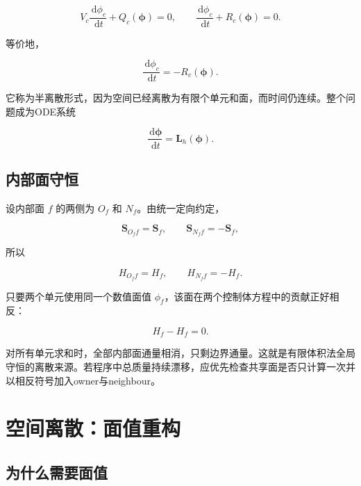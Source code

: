 \documentclass[UTF8,12pt,a4paper,fontset=fandol]{ctexart}
\numberwithin{equation}{section}
\newcommand{\dd}{\,\mathrm d}
\newcommand{\Sf}{\bm S}
\begin{document}
\begin{equation}
  \boxed{
  V_c\frac{\dd\phi_c}{\dd t}+Q_c(\bm\phi)=0,
  \qquad
  \frac{\dd\phi_c}{\dd t}+R_c(\bm\phi)=0
  }.
  \label{eq:semidiscrete}
\end{equation}

等价地，

\begin{equation}
  \boxed{
  \frac{\dd\phi_c}{\dd t}=-R_c(\bm\phi)
  }.
\end{equation}

它称为半离散形式，因为空间已经离散为有限个单元和面，而时间仍连续。整个问题成为ODE系统

\begin{equation}
  \frac{\dd\bm\phi}{\dd t}
  =
  \bm L_h(\bm\phi).
\end{equation}

\subsection{内部面守恒}

设内部面 $f$ 的两侧为 $O_f$ 和 $N_f$。由统一定向约定，

\begin{equation}
  \Sf_{O_f f}=\Sf_f,
  \qquad
  \Sf_{N_f f}=-\Sf_f,
\end{equation}

所以

\begin{equation}
  H_{O_f f}=H_f,
  \qquad
  H_{N_f f}=-H_f.
\end{equation}

只要两个单元使用同一个数值面值 $\phi_f$，该面在两个控制体方程中的贡献正好相反：

\begin{equation}
  H_f-H_f=0.
\end{equation}

对所有单元求和时，全部内部面通量相消，只剩边界通量。这就是有限体积法全局守恒的离散来源。若程序中总质量持续漂移，应优先检查共享面是否只计算一次并以相反符号加入owner与neighbour。

\section{空间离散：面值重构}

\subsection{为什么需要面值}
\end{document}
